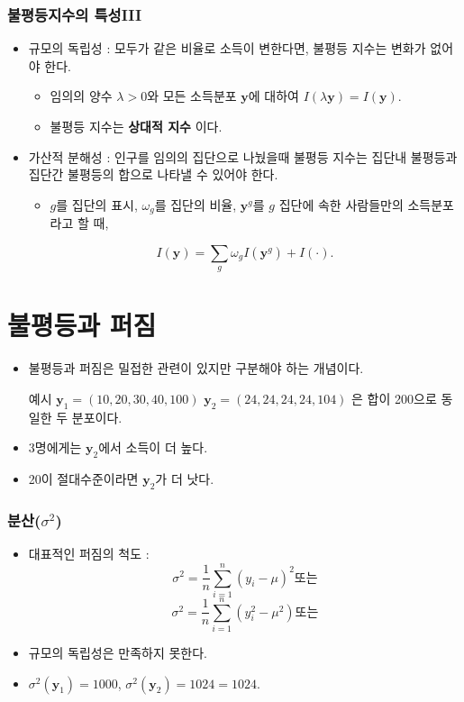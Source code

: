\documentclass[aspectratio=169,xcolor=dvipsnames,]{beamer}
\newcommand{\y}{\mathbf{y}}
\begin{document}
\begin{frame}[<+->]
\frametitle{불평등지수의 특성III}
    \begin{itemize}
        \item 규모의 독립성 : 모두가 같은 비율로 소득이 변한다면, 불평등 지수는 변화가 없어야 한다.
        \begin{itemize}
            \item 임의의 양수 $\lambda > 0$와 모든 소득분포 $\y$에 대하여 $I(\lambda \y) = I(\y)$.
            \item 불평등 지수는 {\bf 상대적 지수} 이다.
        \end{itemize}
        \item 가산적 분해성 : 인구를 임의의 집단으로 나눴을때 불평등 지수는 집단내 불평등과 집단간 불평등의 합으로 나타낼 수 있어야 한다.
        \begin{itemize}
            \item $g$를 집단의 표시, $\omega _g$를 집단의 비율, $\y ^g$를 $g$ 집단에 속한 사람들만의 소득분포라고 할 때, 
        \end{itemize}
        $$ I(\y) = \sum _g \omega _g I(\y ^g) + I(\cdot).$$
    \end{itemize}
\end{frame}
\section{불평등과 퍼짐}
\begin{frame}[<+->]
    \begin{itemize}
        \item 불평등과 퍼짐은 밀접한 관련이 있지만 구분해야 하는 개념이다.
    \begin{exampleblock}{예시}
        $\y _1 = ( 10, 20, 30, 40, 100)$ $\y _2 = ( 24, 24, 24, 24, 104)$ 은 합이 200으로 동일한 두 분포이다. 
    \end{exampleblock}
    \item 3명에게는 $\y _2$에서 소득이 더 높다.
    \item 20이 절대수준이라면 $\y _2$가 더 낫다.
    \end{itemize}
\end{frame}

\begin{frame}[<+->]
\frametitle{분산($\sigma ^2$)}
    \begin{itemize}
        \item 대표적인 퍼짐의 척도 :  
        $$ \sigma ^2  = \frac{1}{n} \sum _{i=1} ^n (y_i - \mu)^2 \text{또는}$$
        $$ \sigma ^2  = \frac{1}{n} \sum _{i=1} ^n (y_i^2 - \mu^2) \text{또는}$$
        \item 규모의 독립성은 만족하지 못한다.
        \item $\sigma ^2 (\y _1)= 1000$, $\sigma ^2 (\y _2)= 1024= 1024$.
    \end{itemize}
\end{frame}
\end{document}
